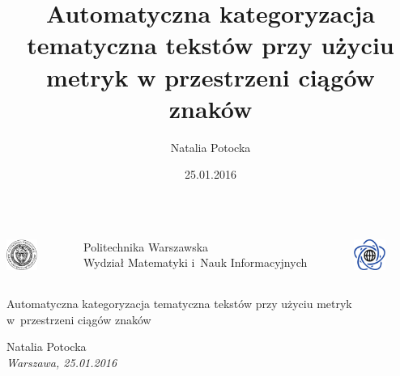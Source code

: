 \documentclass[11pt,pdftex,mathserif]{beamer}
\title[Kategoryzacja tematyczna tekstów ]{Automatyczna kategoryzacja tematyczna tekstów przy użyciu metryk w przestrzeni ciągów znaków}
\author[N. Potocka]{Natalia Potocka}
\date[25.01.2016]{25.01.2016}
\theoremstyle{definition}
\begin{document}
\thispagestyle{empty}%
\begin{frame}%

   \begin{center}%
%
%
%
      \begin{columns}%
         \begin{column}[c]{1.2cm}\centering%
         \includegraphics[height=1.0cm]{logopw.pdf} \\%
         \end{column}

         \begin{column}[c]{7cm}\centering
            {\footnotesize{Politechnika Warszawska}}\\%
            {\footnotesize{Wydział Matematyki i~Nauk Informacyjnych}}%
         \end{column}

         \begin{column}[c]{1.2cm}\centering%
         \includegraphics[height=1.0cm]{logomini.pdf} \\%
         \end{column}%
      \end{columns}


      \vspace*{2em}

      \colorbox{green2}{\parbox{10cm}{\color{black}\centering\LARGE{Automatyczna kategoryzacja tematyczna tekstów przy użyciu metryk w~przestrzeni ciągów znaków}}}

      \vspace*{1.5em}%
      {\Large{Natalia Potocka}}\\%

      {\it\footnotesize Warszawa, 25.01.2016}  %

   \end{center}

\end{frame}
\end{document}
